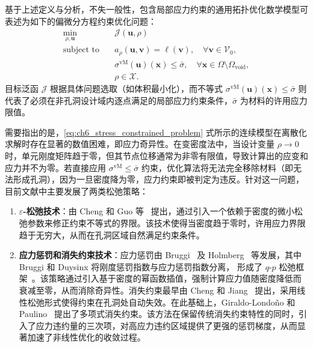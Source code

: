 基于上述定义与分析，不失一般性，包含局部应力约束的通用拓扑优化数学模型可表述为如下的偏微分方程约束优化问题：
\begin{equation} 
	\begin{aligned}
		\min_{\rho,\boldsymbol{u}}\quad&\mathcal{J}(\boldsymbol{u}, \rho)\\
		\text{subject~to}\quad&
		a_\rho(\boldsymbol{u},\boldsymbol{v}) = \ell(\boldsymbol{v}),\quad\forall\boldsymbol{v}\in\mathcal{V}_0,\\
		&\sigma^{\text{vM}}(\boldsymbol{u})(\boldsymbol{x}) \le \bar{\sigma}, \quad \forall \boldsymbol{x} \in \Omega \setminus \Omega_{\text{void}},\\
		&\rho\in\mathcal{X}.
	\end{aligned}
	\label{eq:ch6_stress_constrained_problem}
\end{equation}
目标泛函 $\mathcal{J}$ 根据具体问题选取（如体积最小化），而不等式 $\sigma^{\text{vM}}(\boldsymbol{u})(\boldsymbol{x}) \le \bar{\sigma}$ 则代表了必须在非孔洞设计域内逐点满足的局部应力约束条件，$\bar{\sigma}$ 为材料的许用应力限值。

需要指出的是，\eqref{eq:ch6_stress_constrained_problem} 式所示的连续模型在离散化求解时存在显著的数值困难，即应力奇异性。在变密度法中，当设计变量 $\rho \to 0$ 时，单元刚度矩阵趋于零，但其节点位移通常为非零有限值，导致计算出的应变和应力并不为零。若直接应用 $\sigma^{\text{vM}} \le \bar{\sigma}$ 约束，优化算法将无法完全移除材料（即无法形成孔洞），因为一旦密度降为零，应力约束即被判定为违反。针对这一问题，目前文献中主要发展了两类松弛策略：
\begin{enumerate}[
	label={（\arabic*）},
	labelsep=0.25em,
	leftmargin=3.2em,
	itemsep=0.4em,
	topsep=0.4em,
	parsep=0pt,
	partopsep=0pt
	]
	\item \textbf{$\varepsilon$-松弛技术}：由 Cheng 和 Guo 等~\cite{chengErelaxedApproachStructural1997} 提出，通过引入一个依赖于密度的微小松弛参数来修正约束不等式的界限。该技术使得当密度趋于零时，许用应力界限趋于无穷大，从而在孔洞区域自然满足约束条件。
	
	\item \textbf{应力惩罚和消失约束技术}：应力惩罚由 Bruggi~\cite{bruggiAlternativeApproachStress2008a} 及 Holmberg~\cite{holmbergStressConstrainedTopology2013a} 等发展，其中 Bruggi 和 Duysinx 将刚度惩罚指数与应力惩罚指数分离，
	形成了 $q\text{-}p$ 松弛框架~\cite{bruggiTopologyOptimizationMinimum2012}。该策略通过引入基于密度的幂函数插值，强制计算应力值随密度降低而衰减至零，从而消除奇异性。消失约束最早由 Cheng 和 Jiang~\cite{chengStudyTopologyOptimization1992} 提出，采用线性松弛形式使得约束在孔洞处自动失效。在此基础上，Giraldo-Londoño 和 Paulino~\cite{giraldo-londonoUnifiedApproachTopology2020} 提出了多项式消失约束。该方法在保留传统消失约束特性的同时，引入了应力违约量的三次项，对高应力违约区域提供了更强的惩罚梯度，从而显著加速了非线性优化的收敛过程。
\end{enumerate}


